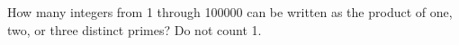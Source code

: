 How many integers from 1 through 100000 can be written as the product of one, two, or three distinct primes? Do not count 1.
